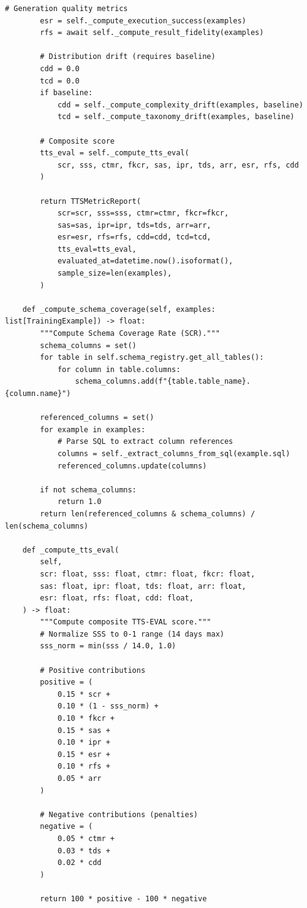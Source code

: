 \begin{lstlisting}[language=jsonx,caption={Training-time drift evaluator (simula\_tts\_drift\_evaluator.py)}]
        # Generation quality metrics
        esr = self._compute_execution_success(examples)
        rfs = await self._compute_result_fidelity(examples)
        
        # Distribution drift (requires baseline)
        cdd = 0.0
        tcd = 0.0
        if baseline:
            cdd = self._compute_complexity_drift(examples, baseline)
            tcd = self._compute_taxonomy_drift(examples, baseline)
        
        # Composite score
        tts_eval = self._compute_tts_eval(
            scr, sss, ctmr, fkcr, sas, ipr, tds, arr, esr, rfs, cdd
        )
        
        return TTSMetricReport(
            scr=scr, sss=sss, ctmr=ctmr, fkcr=fkcr,
            sas=sas, ipr=ipr, tds=tds, arr=arr,
            esr=esr, rfs=rfs, cdd=cdd, tcd=tcd,
            tts_eval=tts_eval,
            evaluated_at=datetime.now().isoformat(),
            sample_size=len(examples),
        )
    
    def _compute_schema_coverage(self, examples: list[TrainingExample]) -> float:
        """Compute Schema Coverage Rate (SCR)."""
        schema_columns = set()
        for table in self.schema_registry.get_all_tables():
            for column in table.columns:
                schema_columns.add(f"{table.table_name}.{column.name}")
        
        referenced_columns = set()
        for example in examples:
            # Parse SQL to extract column references
            columns = self._extract_columns_from_sql(example.sql)
            referenced_columns.update(columns)
        
        if not schema_columns:
            return 1.0
        return len(referenced_columns & schema_columns) / len(schema_columns)
    
    def _compute_tts_eval(
        self,
        scr: float, sss: float, ctmr: float, fkcr: float,
        sas: float, ipr: float, tds: float, arr: float,
        esr: float, rfs: float, cdd: float,
    ) -> float:
        """Compute composite TTS-EVAL score."""
        # Normalize SSS to 0-1 range (14 days max)
        sss_norm = min(sss / 14.0, 1.0)
        
        # Positive contributions
        positive = (
            0.15 * scr +
            0.10 * (1 - sss_norm) +
            0.10 * fkcr +
            0.15 * sas +
            0.10 * ipr +
            0.15 * esr +
            0.10 * rfs +
            0.05 * arr
        )
        
        # Negative contributions (penalties)
        negative = (
            0.05 * ctmr +
            0.03 * tds +
            0.02 * cdd
        )
        
        return 100 * positive - 100 * negative
\end{lstlisting}

